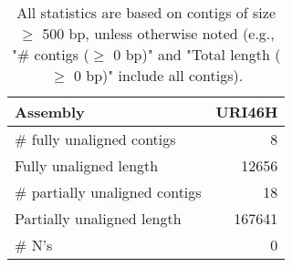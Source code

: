 \documentclass[12pt,a4paper]{article}
\begin{document}
\begin{table}[ht]
\begin{center}
\caption{All statistics are based on contigs of size $\geq$ 500 bp, unless otherwise noted (e.g., "\# contigs ($\geq$ 0 bp)" and "Total length ($\geq$ 0 bp)" include all contigs).}
\begin{tabular}{|l*{1}{|r}|}
\hline
Assembly & URI46H \\ \hline
\# fully unaligned contigs & 8 \\ \hline
Fully unaligned length & 12656 \\ \hline
\# partially unaligned contigs & 18 \\ \hline
Partially unaligned length & 167641 \\ \hline
\# N's & 0 \\ \hline
\end{tabular}
\end{center}
\end{table}
\end{document}

